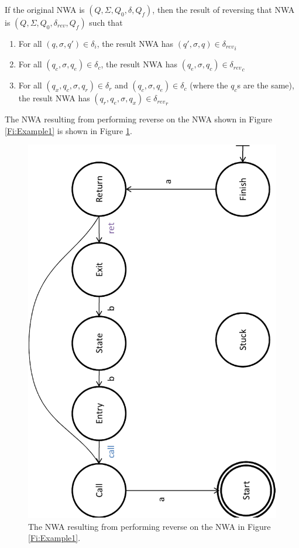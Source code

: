 If the original NWA is $(Q, \Sigma, Q_0, \delta, Q_f)$, then the result of
reversing that NWA is $(Q, \Sigma, Q_0, \delta_{rev}, Q_f)$ such that

\begin{enumerate}

\item For all $(q,\sigma,q') \in \delta_i$, the result NWA has $(q',\sigma,q)
  \in {\delta_{rev}}_i$

\item For all $(q_c,\sigma,q_e) \in \delta_c$, the result NWA has
  $(q_e,\sigma,q_c) \in {\delta_{rev}}_c$

\item For all $(q_x,q_c,\sigma,q_r) \in \delta_r$ and $(q_c,\sigma,q_e) \in
  \delta_c$ (where the $q_c$s are the same), the result NWA has
  $(q_r,q_e,\sigma,q_x) \in {\delta_{rev}}_r$

\end{enumerate}

\noindent The NWA resulting from performing reverse on the NWA shown in
Figure \ref{Fi:Example1} is shown in Figure \ref{Fi:Reverse1}.
 
\begin{figure}[p]
  \centering
    \includegraphics[width=12cm]{Figures/Figure15}
  \caption{The NWA resulting from performing reverse on the NWA in Figure \ref{Fi:Example1}.}
  \label{Fi:Reverse1}
\end{figure}

